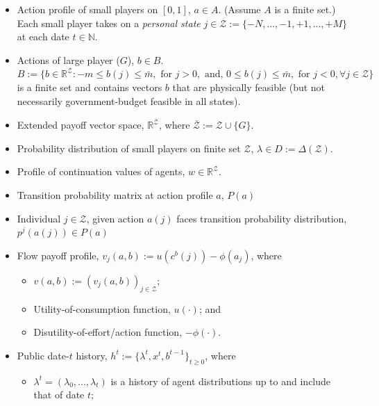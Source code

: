 \documentclass[a4paper,10pt,english]{sphinxmanual}
\begin{document}
\begin{itemize}
\item {} 
Action profile of small players on \([0,1]\), \(a \in A\). (Assume \(A\) is a
finite set.) Each small player takes on a \emph{personal state} \(j \in
\mathcal{Z} := \{ -N,...,-1,+1,...,+M\}\) at each date \(t \in
\mathbb{N}\).

\item {} 
Actions of large player (\(G\)), \(b \in B\). \(B := \{b \in
\mathbb{R}^{\mathcal{Z}}: -m \leq b(j) \leq \bar{m}, \text{ for } j > 0,
\text{ and, } 0 \leq b(j) \leq \bar{m}, \text{ for } j < 0, \forall j \in
\mathcal{Z}\}\) is a
finite set and contains vectors \(b\) that are physically feasible
(but not necessarily government-budget feasible in all states).

\item {} 
Extended payoff vector space, \(\mathbb{R}^{\overline{\mathcal{Z}}}\),
where \(\overline{\mathcal{Z}} := \mathcal{Z} \cup \{G\}\).

\item {} 
Probability distribution of small players on finite set
\(\mathcal{Z}\), \(\lambda \in D := \Delta(\mathcal{Z})\).

\item {} 
Profile of continuation values of agents, \(w \in
\mathbb{R}^{\mathcal{Z}}\).

\item {} 
Transition probability matrix at action profile \(a\), \(P(a)\)

\item {} 
Individual \(j \in \mathcal{Z}\), given action \(a(j)\) faces transition probability distribution, \(p^j(a(j)) \in P(a)\)

\item {} 
Flow payoff profile, \(v_j(a,b):= u(c^b(j))-\phi(a_j)\), where
\begin{itemize}
\item {} 
\(v(a,b):=(v_j(a,b))_{j\in \mathcal{Z}}\);

\item {} 
Utility-of-consumption function, \(u(\cdot)\); and

\item {} 
Disutility-of-effort/action function, \(-\phi(\cdot)\).

\end{itemize}

\item {} 
Public date-\(t\) history, \(h^t := \{ \lambda^t, x^t, b^{t-1} \}_{t \geq 0}\), where
\begin{itemize}
\item {} 
\(\lambda^t = (\lambda_0,...,\lambda_t)\) is a history of agent
distributions up to and include that of date \(t\);


\end{itemize}
\end{itemize}
\end{document}
